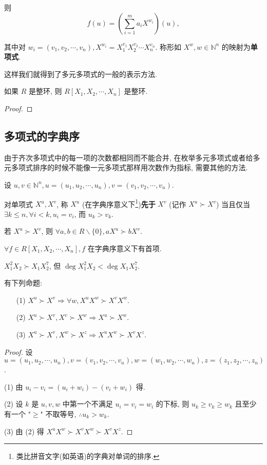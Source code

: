 \documentclass[UTF8]{ctexart}
\begin{document}
则
\[f(u)=\left(\sum\limits_{i=1}^ma_iX^{w_i}\right)(u),\]

其中对 $w_i=(v_1,v_2,\cdots,v_n),X^{w_i}=X_1^{v_1}X_2^{v_2}\cdots X_n^{v_n}$. 称形如 $X^w,w\in\mathbb{N}^n$ 的映射为\textbf{单项式}.

这样我们就得到了多元多项式的一般的表示方法.
\begin{proposition}
    如果 $R$ 是整环, 则 $R[X_1,X_2,\cdots,X_n]$ 是整环.
\end{proposition}
\begin{proof}



\end{proof}
\subsection{多项式的字典序}
由于齐次多项式中的每一项的次数都相同而不能合并, 在枚举多元多项式或者给多元多项式排序的时候不能像一元多项式那样用次数作为指标, 需要其他的方法.

设 $u,v\in\mathbb{N}^n,u=(u_1,u_2,\cdots,u_n),v=(v_1,v_2,\cdots,v_n)$.

对单项式 $X^u,X^v$, 称 $X^u$ (在字典序意义下\footnote{类比拼音文字(如英语)的字典对单词的排序.})\textbf{先于} $X^v$ (记作 $X^u\succ X^v$) 当且仅当 $\exists k\leq n,\forall i<k,u_i=v_i$, 而 $u_k>v_k$.

若 $X^u\succ X^v$, 则 $\forall a,b\in R\backslash\{0\},aX^u\succ bX^v$.

$\forall f\in R[X_1,X_2,\cdots,X_n],f$ 在字典序意义下有首项.
\begin{example}
    $X_1^2X_2\succ X_1X_2^7$, 但 $\deg X_1^2X_2<\deg X_1X_2^7$.
\end{example}
有下列命题:
\begin{proposition}
    \begin{itemize}
        \item[(1)] $X^u\succ X^v\Rightarrow\forall w,X^uX^w\succ X^vX^w$.
        \item[(2)] $X^u\succ X^v,X^v\succ X^w\Rightarrow X^u\succ X^w$.
        \item[(3)] $X^u\succ X^v,X^w\succ X^z\Rightarrow X^uX^w\succ X^vX^z$.
    \end{itemize}
\end{proposition}
\begin{proof}
    设 $u=(u_1,u_2,\cdots,u_n),v=(v_1,v_2,\cdots,v_n),w=(w_1,w_2,\cdots,w_n),z=(z_1,z_2,\cdots,z_n)$.

    (1) 由 $u_i-v_i=(u_i+w_i)-(v_i+w_i)$ 得.

    (2) 设 $k$ 是 $u,v,w$ 中第一个不满足 $u_i=v_i=w_i$ 的下标, 则 $u_k\geq v_k\geq w_k$ 且至少有一个 "$\geq$" 不取等号, $\therefore u_k>w_k$.

    (3) 由 (2) 得 $X^uX^w\succ X^vX^w\succ X^vX^z$.
\end{proof}
\end{document}
